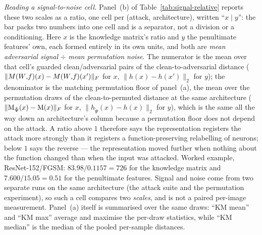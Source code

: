 \begin{clarifybox}
\emph{Reading a signal-to-noise cell.} Panel~(b) of
Table~\ref{tab:signal-relative} reports these two scales as a ratio, one cell
per (attack, architecture), written ``$x \mid y$'': the bar packs two numbers
into one cell and is a separator, not a division or a conditioning. Here $x$ is
the knowledge matrix's ratio and $y$ the penultimate features' own, each formed
entirely in its own units, and both are \emph{mean adversarial signal} $\div$
\emph{mean permutation noise}. The numerator is the mean over that cell's
guarded clean/adversarial pairs of the clean-to-adversarial distance
($\|M(W{,}f)(x)-M(W{,}f)(x')\|_F$ for $x$, $\|h(x)-h(x')\|_2$ for $y$); the denominator is
the matching permutation floor of panel~(a), the mean over the permutation
draws of the clean-to-permuted distance at the same architecture
($\|\mathrm{M}_{\tilde\Psi}(x)-\mathrm{M}(x)\|_F$ for $x$, $\|h_{\tilde\Psi}(x)-h(x)\|_2$ for $y$),
which is the same all the way down an architecture's column because a
permutation floor does not depend on the attack. A ratio above $1$ therefore
says the representation registers the attack more strongly than it registers a
function-preserving relabelling of neurons; below $1$ says the reverse --- the
representation moved further when nothing about the function changed than when
the input was attacked. Worked example, ResNet-152/FGSM: $83.98/0.1157 = 726$
for the knowledge matrix and $7.600/15.05 = 0.51$ for the penultimate features.
Signal and noise come from two separate runs on the same architecture (the
attack suite and the permutation experiment), so such a cell compares two
\emph{scales}, and is not a paired per-image measurement. Panel~(a) itself is
summarised over the same draws: ``KM mean'' and ``KM max'' average and maximise
the per-draw statistics, while ``KM median'' is the median of the pooled
per-sample distances.
\end{clarifybox}

